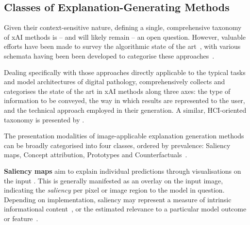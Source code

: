 
\subsection{Classes of Explanation-Generating Methods}
\label{sec:related:classes}

Given their context-sensitive nature, defining a single, comprehensive taxonomy of xAI methods is -- and will likely remain -- an open question. However, valuable efforts have been made to survey the algorithmic state of the art~\cite{tjoa_survey_2020, deshpande2021}, with various schemata having been been developed to categorise these approaches~\cite{arrieta2020explainable}.

Dealing specifically with those approaches directly applicable to the typical tasks and model architectures of digital pathology, \citet{poceviciute_survey_2020} comprehensively collects and categorises the state of the art in xAI methods along three axes: the type of information to be conveyed, the way in which results are represented to the user, and the technical approach employed in their generation. A similar, HCI-oriented taxonomy is presented by \citet{liao2020questioning}. 

The presentation modalities of image-applicable explanation generation methods can be broadly categorised into four classes, ordered by prevalence: Saliency maps, Concept attribution, Prototypes and Counterfactuals~\cite{bodria_benchmarking_2021}.

\textbf{Saliency maps} aim to explain individual predictions through visualisations on the input \cite{MorchEtAl:1995:Saliency}. This is generally manifested as an overlay on the input image, indicating the \textit{saliency} per pixel or image region to the model in question. Depending on implementation, saliency may represent a measure of intrinsic informational content~\cite{KadirBrady:2001:Saliency}, or the estimated relevance to a particular model outcome or feature~\cite{SimonyanVedaldiZisserman:2013:DeepInside, springenberg2014striving, yosinski2015deepvisualization, LapuschkinEtAl:2016:LRP, selvaraju2017grad, ribeiro2018anchors}.

